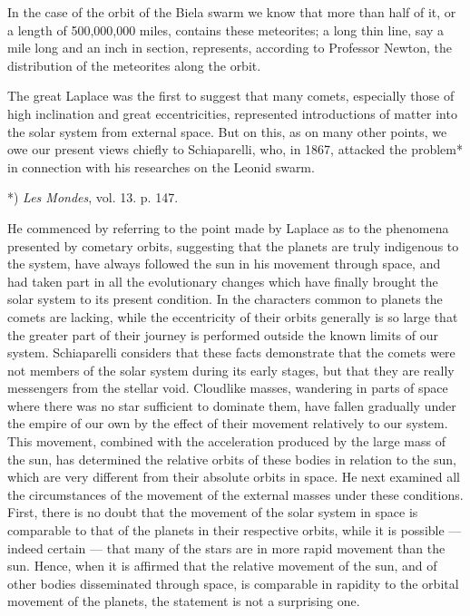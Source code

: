 \documentclass[a4paper, 12pt, oneside, polutonikogreek, english]{article}
\begin{document}
In the case of the orbit of the Biela swarm we know that more than half of it, or a length of 500,000,000 miles, contains these meteorites; a long thin line, say a mile long and an inch in section, represents, according to Professor Newton, the distribution of the meteorites along the orbit.

The great Laplace was the first to suggest that many comets, especially those of high inclination and great eccentricities, represented introductions of matter into the solar system from external space. But on this, as on many other points, we owe our present views chiefly to Schiaparelli, who, in 1867, attacked the problem* in connection with his researches on the Leonid swarm.

*) \emph{Les Mondes}, vol. 13. p. 147.

He commenced by referring to the point made by Laplace as to the phenomena presented by cometary orbits, suggesting that the planets are truly indigenous to the system, have always followed the sun in his movement through space, and had taken part in all the evolutionary changes which have finally brought the solar system to its present condition. In the characters common to planets the comets are lacking, while the eccentricity of their orbits generally is so large that the greater part of their journey is performed outside the known limits of our system. Schiaparelli considers that these facts demonstrate that the comets were not members of the solar system during its early stages, but that they are really messengers from the stellar void. Cloudlike masses, wandering in parts of space where there was no star sufficient to dominate them, have fallen gradually under the empire of our own by the effect of their movement relatively to our system. This movement, combined with the acceleration produced by the large mass of the sun, has determined the relative orbits of these bodies in relation to the sun, which are very different from their absolute orbits in space. He next examined all the circumstances of the movement of the external masses under these conditions. First, there is no doubt that the movement of the solar system in space is comparable to that of the planets in their respective orbits, while it is possible --- indeed certain --- that many of the stars are in more rapid movement than the sun. Hence, when it is affirmed that the relative movement of the sun, and of other bodies disseminated through space, is comparable in rapidity to the orbital movement of the planets, the statement is not a surprising one.
\end{document}
